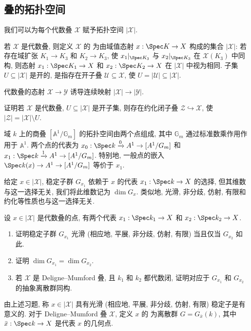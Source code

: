 \subsection{叠的拓扑空间}\label{src:4.3.4-subsection}
我们可以为每个代数叠 $\mathcal X$ 赋予拓扑空间 $|\mathcal X|$.
\begin{definition}[代数叠的拓扑空间]\label{src:4.3.17}
若 $\mathcal X$ 是代数叠, 则定义 $\mathcal X$ 的 为由域值态射 $x:\Spec K\to\mathcal X$ 构成的集合 $|\mathcal X|$: 若存在域扩张 $K_1\to K_3$ 和 $K_2\to K_3$, 使 $x_1|_{\Spec K_3}$ 与 $x_2|_{\Spec K_3}$ 在 $\mathcal X(K_3)$ 中同构, 则态射 $x_1:\Spec K_1\to\mathcal X$ 和 $x_2:\Spec K_2\to\mathcal X$ 在 $|\mathcal X|$ 中视为相同. 子集 $U\subseteq|\mathcal X|$ 是开的, 是指存在开子叠 $\mathcal U\subseteq\mathcal X$, 使 $U=|\mathcal U|\subseteq|\mathcal X|$.
\end{definition}
代数叠的态射 $\mathcal X\to\mathcal Y$ 诱导连续映射 $|\mathcal X|\to|\mathcal Y|$.
\begin{exercise}\label{src:4.3.18}
证明若 $\mathcal X$ 是代数叠, $U\subseteq|\mathcal X|$ 是开子集, 则存在约化闭子叠 $\mathcal Z\hookrightarrow\mathcal X$, 使 $|\mathcal Z|=|\mathcal X|\setminus U$.
\end{exercise}
\begin{example}\label{src:4.3.19}
域 $k$ 上的商叠 $[\mathbb A^1/\mathbb G_m]$ 的拓扑空间由两个点组成, 其中 $\mathbb G_m$ 通过标准数乘作用作用于 $\mathbb A^1$. 两个点的代表为 $x_0:\Spec k\xrightarrow{0}\mathbb A^1\to[\mathbb A^1/\mathbb G_m]$ 和 $x_1:\Spec k\xrightarrow{1}\mathbb A^1\to[\mathbb A^1/\mathbb G_m]$. 特别地, 一般点的嵌入 $\Spec k(x)\to\mathbb A^1\to[\mathbb A^1/\mathbb G_m]$ 等价于 $x_1$.
\end{example}
给定 $x\in|\mathcal X|$, 稳定子群 $G_{x_1}$ 依赖于 $x$ 的代表 $x_1:\Spec k\to\mathcal X$ 的选择, 但其维数与这一选择无关, 我们将此维数记为 $\dim G_x$. 类似地, 光滑, 非分歧, 仿射, 有限和约化等性质也与这一选择无关.
\begin{exercise}[简单]\label{src:4.3.20}
设 $x\in|\mathcal X|$ 是代数叠的点, 有两个代表 $x_1:\Spec k_1\to\mathcal X$ 和 $x_2:\Spec k_2\to\mathcal X$.
\begin{enumerate}[(1)]
\item 证明稳定子群 $G_{x_1}$ 光滑 (相应地, 平展, 非分歧, 仿射, 有限) 当且仅当 $G_{x_2}$ 如此.
\item 证明 $\dim G_{x_1}=\dim G_{x_2}$.
\item 若 $\mathcal X$ 是 Deligne--Mumford 叠, 且 $k_1$ 和 $k_2$ 都代数闭, 证明对应于 $G_{x_1}$ 和 $G_{x_2}$ 的抽象离散群同构.
\end{enumerate}
\end{exercise}
由上述习题, 称 $x\in|\mathcal X|$ 具有光滑 (相应地, 平展, 非分歧, 仿射, 有限) 稳定子是有意义的. 对于 Deligne--Mumford 叠 $\mathcal X$, 定义 $x$ 的 为离散群 $G=G_{\bar x}(k)$, 其中 $\bar x:\Spec k\to\mathcal X$ 是代表 $x$ 的几何点.

